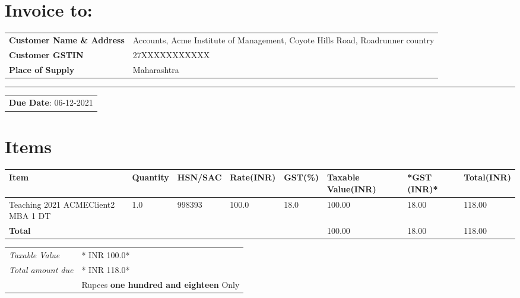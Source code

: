 \documentclass[10pt]{article}
\begin{document}
\section{Invoice to:}
\label{invoiceto}
\begin{center}
\begin{tabular}{a{3.5cm}a{10.5cm}}
\textbf{Customer Name \& Address} & Accounts, Acme Institute of Management, Coyote Hills Road, Roadrunner country\\
\textbf{Customer GSTIN} & 27XXXXXXXXXXX\\
\textbf{Place of Supply} & Maharashtra\\
\end{tabular}
\end{center}

\noindent\rule{\textwidth}{0.5pt}
\begin{center}
\begin{tabular}{a{4.5cm}}
\textbf{Due Date}: 06-12-2021\\
\end{tabular}
\end{center}
\section{Items}
\label{sec:orgaff8825}

\begin{table}[htbp]
\label{tab-items-06-11-2021}
\centering
\begin{tabular}{a{4.25cm}p{1.25cm}a{1.5cm}p{1cm}a{1.25cm}p{1.25cm}a{1.15cm}p{1.35cm}}
\textbf{Item} & \textbf{Quantity} & \textbf{HSN/SAC} & \textbf{Rate(INR)} & \textbf{GST(\%)} & \textbf{Taxable Value(INR)} & \textbf{*GST} (INR)* & \textbf{Total(INR)}\\
\hline
Teaching 2021 ACMEClient2 MBA 1 DT & 1.0 & 998393 & 100.0 & 18.0 & 100.00 & 18.00 & 118.00\\
\textbf{Total} &  &  &  &  & 100.00 & 18.00 & 118.00\\
\end{tabular}
\end{table}

\begin{center}
\begin{tabular}{la{8cm}}
\emph{Taxable Value} & * INR 100.0*\\
\emph{Total amount due} & * INR 118.0*\\
 & Rupees \textbf{one hundred and eighteen} Only\\
\end{tabular}
\end{center}
\end{document}
